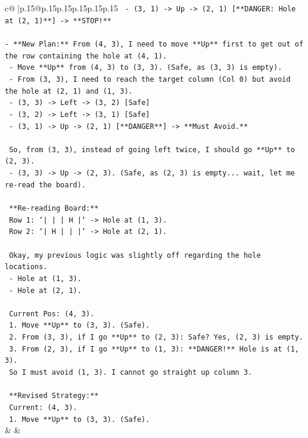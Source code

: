\documentclass{article}
\begin{document}
{\begin{supertabular}{c@{$\;$}|p{.15\linewidth}@{}p{.15\linewidth}p{.15\linewidth}p{.15\linewidth}p{.15\linewidth}p{.15\linewidth}}
{{{\texttt{  {-} (3, 1) {-}> Up {-}> (2, 1) {[}**DANGER: Hole at (2, 1)**{]} {-}> **STOP!**} \\
\\ 
\texttt{{-} **New Plan:** From (4, 3), I need to move **Up** first to get out of the row containing the hole at (4, 1).} \\
\texttt{  {-} Move **Up** from (4, 3) to (3, 3). (Safe, as (3, 3) is empty).} \\
\texttt{  {-} From (3, 3), I need to reach the target column (Col 0) but avoid the hole at (2, 1) and (1, 3).} \\
\texttt{  {-} (3, 3) {-}> Left {-}> (3, 2) {[}Safe{]}} \\
\texttt{  {-} (3, 2) {-}> Left {-}> (3, 1) {[}Safe{]}} \\
\texttt{  {-} (3, 1) {-}> Up {-}> (2, 1) {[}**DANGER**{]} {-}> **Must Avoid.**} \\
\\ 
\texttt{  So, from (3, 3), instead of going left twice, I should go **Up** to (2, 3).} \\
\texttt{  {-} (3, 3) {-}> Up {-}> (2, 3). (Safe, as (2, 3) is empty... wait, let me re{-}read the board).} \\
\\ 
\texttt{  **Re{-}reading Board:**} \\
\texttt{  Row 1: `|     |     | H |` {-}> Hole at (1, 3).} \\
\texttt{  Row 2: `| H |     |     |` {-}> Hole at (2, 1).} \\
\\ 
\texttt{  Okay, my previous logic was slightly off regarding the hole locations.} \\
\texttt{  {-} Hole at (1, 3).} \\
\texttt{  {-} Hole at (2, 1).} \\
\\ 
\texttt{  Current Pos: (4, 3).} \\
\texttt{  1. Move **Up** to (3, 3). (Safe).} \\
\texttt{  2. From (3, 3), if I go **Up** to (2, 3): Safe? Yes, (2, 3) is empty.} \\
\texttt{  3. From (2, 3), if I go **Up** to (1, 3): **DANGER!** Hole is at (1, 3).} \\
\texttt{     So I must avoid (1, 3). I cannot go straight up column 3.} \\
\\ 
\texttt{  **Revised Strategy:**} \\
\texttt{  Current: (4, 3).} \\
\texttt{  1. Move **Up** to (3, 3). (Safe).} \\
            }
        }
    }
    & & \\ \\


\end{supertabular}}
\end{document}

